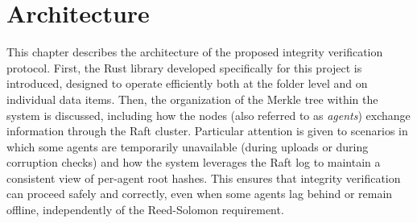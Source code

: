 \chapter{Architecture}

 This chapter describes the architecture of the proposed integrity verification
 protocol. First, the Rust library developed specifically for this project is
 introduced, designed to operate efficiently both at the folder level and on
 individual data items. Then, the organization of the Merkle tree within the
 system is discussed, including how the nodes (also referred to as
 \textit{agents}) exchange information through the Raft cluster. Particular attention is given to scenarios in which some agents are temporarily unavailable (during uploads or during corruption checks) and how the system leverages the Raft log to maintain a consistent view of per-agent root hashes. This ensures that integrity verification can proceed safely and correctly, even when some agents lag behind or remain offline, independently of the Reed-Solomon requirement.




